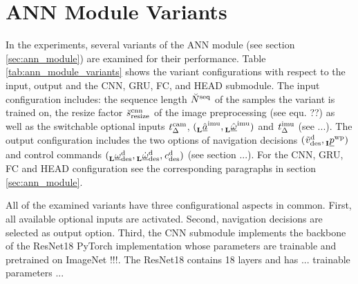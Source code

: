 \section{ANN Module Variants}
In the experiments, several
variants of the ANN module (see section \ref{sec:ann_module})
are examined for their performance.
Table \ref{tab:ann_module_variants} shows the variant configurations
with respect to the input, output and the 
CNN, GRU, FC, and HEAD submodule.
The input configuration includes:
the sequence length ${}_{}^{} \breve{N}^{\text{seq}}_{}$ of the samples the variant is trained on,
the resize factor ${}_{}^{} \breve{s}^{\text{cnn}}_{\text{resize}}$ of the image preprocessing (see equ. ??)
as well as the switchable optional inputs
${}_{}^{} {t}^{\text{cam}}_{\Delta }$, 
$({}_{\textbf{L}}^{} \hat{\underline a}^{\text{imu}}_{},{}_{\textbf{L}}^{} \hat{\underline \omega}^{\text{imu}}_{})$
and
${}_{}^{} {t}^{\text{imu}}_{\Delta }$ (see ...).
The output configuration includes
the two options of navigation decisions 
$({}_{}^{} \tilde{v}^{\text{d}}_{\text{des}}, {}_{\textbf{I}}^{} {\underline p}^{\text{wp}}_{})$
and control commands 
$({}_{\textbf{L}}^{} {\underline \omega}^{\text{d}}_{\text{des}}, {}_{\textbf{L}}^{} \dot{\underline \omega}^{\text{d}}_{\text{des}}, {}_{}^{} {c}^{\text{d}}_{\text{des}})$ (see section ...).
For the CNN, GRU, FC and HEAD configuration
see the corresponding paragraphs in section \ref{sec:ann_module}. 


All of the examined variants have three configurational aspects in common.
First, all available optional inputs are activated.
Second, navigation decisions are selected as output option.
Third, the CNN submodule implements the backbone of the ResNet18 PyTorch implementation
whose parameters are trainable and pretrained on ImageNet !!!.
The ResNet18 contains 18 layers and has ... trainable parameters ...








